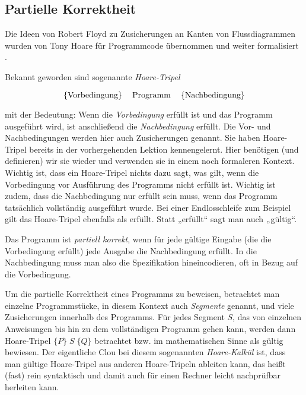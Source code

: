 \subsection{Partielle Korrektheit}
\label{sec:Kap-11-2-2}

Die Ideen von Robert Floyd zu Zusicherungen an Kanten von Flussdiagrammen wurden von Tony Hoare für Programmcode übernommen und weiter formalisiert \cite{hoa69}. 

\vspace{1.7mm} %

Bekannt geworden sind sogenannte \emph{Hoare-Tripel}

\vspace{\baselineskip} %

$$\text{ \{Vorbedingung\} \;\; Programm \;\; \{Nachbedingung\} }$$

\vspace{\baselineskip} %

mit der Bedeutung: Wenn die \emph{Vorbedingung} erfüllt ist und das Programm ausgeführt wird, ist anschließend die \emph{Nachbedingung} erfüllt. Die Vor- und Nachbedingungen werden hier auch Zusicherungen genannt. Sie haben Hoare-Tripel bereits in der vorhergehenden Lektion kennengelernt. Hier benötigen (und definieren) wir sie wieder und verwenden sie in einem noch formaleren Kontext. Wichtig ist, dass ein Hoare-Tripel nichts dazu sagt, was gilt, wenn die Vorbedingung vor Ausführung des Programms nicht erfüllt ist. Wichtig ist zudem, dass die Nachbedingung nur erfüllt sein muss, wenn das Programm tatsächlich vollständig ausgeführt wurde. Bei einer Endlosschleife zum Beispiel gilt das Hoare-Tripel ebenfalls als erfüllt. Statt „erfüllt“ sagt man auch „gültig“.

Das Programm ist \emph{partiell korrekt}, wenn für jede gültige Eingabe (die die Vorbedingung erfüllt) jede Ausgabe die Nachbedingung erfüllt. In die Nachbedingung muss man also die Spezifikation hineincodieren, oft in Bezug auf die Vorbedingung.

Um die partielle Korrektheit eines Programms zu beweisen, betrachtet man einzelne Programmstücke, in diesem Kontext auch \textit{Segmente} genannt, und viele Zusicherungen innerhalb des Programms. Für jedes Segment $S$, das von einzelnen Anweisungen bis hin zu dem vollständigen Programm gehen kann, werden dann Hoare-Tripel $\{P\} \; S \; \{Q\}$ betrachtet bzw. im mathematischen Sinne als gültig bewiesen. Der eigentliche Clou bei diesem sogenannten \emph{Hoare-Kalkül} 
ist, dass man gültige Hoare-Tripel aus anderen Hoare-Tripeln ableiten kann, das heißt (fast) rein syntaktisch und damit auch für einen Rechner leicht nachprüfbar herleiten kann.


